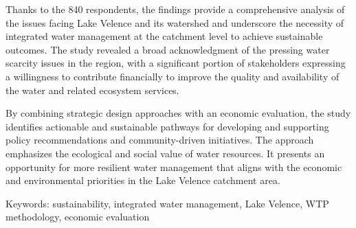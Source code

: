 Thanks to the 840 respondents, the findings provide a comprehensive analysis of the issues facing Lake Velence and its watershed and underscore the necessity of integrated water management at the catchment level to achieve sustainable outcomes. The study revealed a broad acknowledgment of the pressing water scarcity issues in the region, with a significant portion of stakeholders expressing a willingness to contribute financially to improve the quality and availability of the water and related ecosystem services. 

By combining strategic design approaches with an economic evaluation, the study identifies actionable and sustainable pathways for developing and supporting policy recommendations and community-driven initiatives. The approach emphasizes the ecological and social value of water resources. It presents an opportunity for more resilient water management that aligns with the economic and environmental priorities in the Lake Velence catchment area.

Keywords: sustainability, integrated water management, Lake Velence, WTP methodology, economic evaluation
\newpage{}
{}
\begin{flushleft}






\end{flushleft}

\noindent
 
